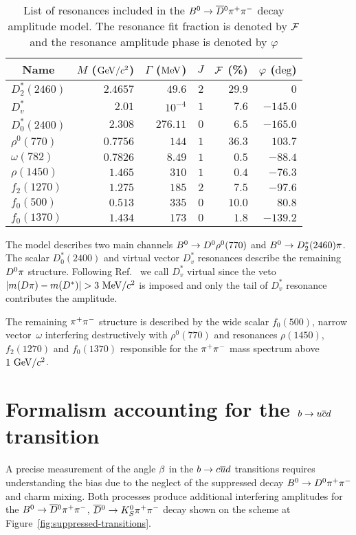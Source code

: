 \documentclass[a4paper,11pt]{article}
\begin{document}
\begin{table}[t]
 \caption{List of resonances included in the $B^0\to\overline{D}{}^0\pi^+\pi^-$ decay amplitude model.  
The resonance fit fraction is denoted by $\mathcal{F}$ and the resonance amplitude phase 
is denoted by $\varphi$}
  \label{tab:bdpp_res_list}
  \centering
 \begin{tabular}{lrrrrr}
  \hline\hline
   \multicolumn{1}{c}{Name} &
   \multicolumn{1}{c}{$M$ ($\mathrm{GeV}/c^{2}$)} &
   \multicolumn{1}{c}{$\Gamma$ ($\mathrm{MeV}$)} &
   \multicolumn{1}{c}{$J$} &
   \multicolumn{1}{c}{$\mathcal{F}$ (\%)} &
   \multicolumn{1}{c}{$\varphi$ ($\mathrm{deg}$)}
   \\ \hline
   $D^*_2(2460)$ & $2.4657$   & $49.6$      & $2$  & $29.9$ & $0$      \\
   $D^*_v$       & $2.01$     & $10^{-4}$   & $1$  & $7.6$  & $-145.0$ \\
   $D^*_0(2400)$ & $2.308$    & $276.11$    & $0$  & $6.5$  & $-165.0$ \\ \hline
   $\rho^0(770)$ & $0.7756$   & $144$       & $1$  & $36.3$ & $103.7$  \\
   $\omega(782)$ & $0.7826$   & $8.49$      & $1$  & $0.5$  & $-88.4$  \\
   $\rho(1450)$  & $1.465$    & $310$       & $1$  & $0.4$  & $-76.3$  \\
   $f_2(1270)$   & $1.275$    & $185$       & $2$  & $7.5$  & $-97.6$  \\
   $f_0(500)$    & $0.513$    & $335$       & $0$  & $10.0$ & $80.8$   \\
   $f_0(1370)$   & $1.434$    & $173$       & $0$  & $1.8$  & $-139.2$ \\
  \hline\hline
 \end{tabular}
\end{table}

The model describes two main channels $B^0\to D^0\rho^0(770)$ and 
$B^0\to D_2^{\ast}(2460)\pi$.  The scalar $D^*_0(2400)$ and virtual vector $D^*_v$ 
resonances describe the remaining $D^0\pi$ structure.  Following Ref.~\cite{bdpp_belle} 
we call $D^*_v$ virtual since the veto $\left|m(D\pi) - m(D^*)\right| > 3~\mathrm{MeV}/c^{2}$ 
is imposed and only the tail of $D^*_v$ resonance contributes the amplitude.  

The remaining $\pi^+\pi^-$ structure is described by the wide scalar $f_0(500)$, narrow vector~$\omega$ 
interfering destructively with $\rho^0(770)$ and resonances $\rho(1450)$, $f_2(1270)$ and $f_0(1370)$
responsible for the $\pi^+\pi^-$ mass spectrum above $1~\mathrm{GeV}/c^{2}$.  

\section{\boldmath Formalism accounting for the \texorpdfstring{$b\to u\overline{c}d$}{b -> c ubar d} 
transition}\label{app:bucbard}
A precise measurement of the angle $\beta$ in the $b\to c\overline{u}d$ transitions requires 
understanding the bias due to the neglect of the suppressed decay $B^0\to D^0\pi^+\pi^-$ and 
charm mixing.  Both processes produce additional interfering amplitudes 
for the $B^0\to \overline{D}{}^0 \pi^+\pi^-$, $\overline{D}{}^0\to K_S^0\pi^+\pi^-$ decay shown on the scheme at
Figure~\ref{fig:suppressed-transitions}.
\end{document}
